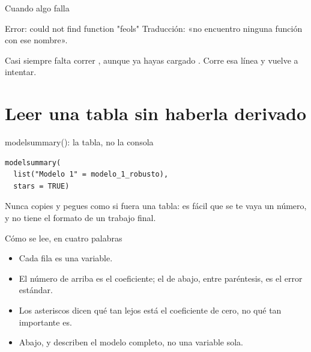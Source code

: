 \begin{frame}{Cuando algo falla}
  \vspace{0.4em}
  \begin{errorbox}{Error: could not find function "feols"}
    Traducción: «no encuentro ninguna función con ese nombre».

    \vspace{0.5em}
    Casi siempre falta correr , aunque ya hayas
    cargado . Corre esa línea y vuelve a intentar.
  \end{errorbox}
\end{frame}

\section{Leer una tabla sin haberla derivado}

\begin{frame}[fragile]{modelsummary(): la tabla, no la consola}
\begin{lstlisting}
modelsummary(
  list("Modelo 1" = modelo_1_robusto),
  stars = TRUE)
\end{lstlisting}

  \vspace{0.6em}
  Nunca copies y pegues  como si fuera una tabla: es fácil
  que se te vaya un número, y no tiene el formato de un trabajo final.
\end{frame}

\begin{frame}{Cómo se lee, en cuatro palabras}
  \vspace{0.3em}
  \begin{itemize}\setlength{\itemsep}{0.8em}
    \item<1-> Cada \ac{fila} es una variable.
    \item<2-> El número de arriba es el coeficiente; el de abajo, entre
          paréntesis, es el error estándar.
    \item<3-> Los asteriscos dicen qué tan lejos está el coeficiente de
          cero, no qué tan importante es.
    \item<4-> Abajo,  y  describen el modelo completo, no
          una variable sola.
  \end{itemize}
\end{frame}

